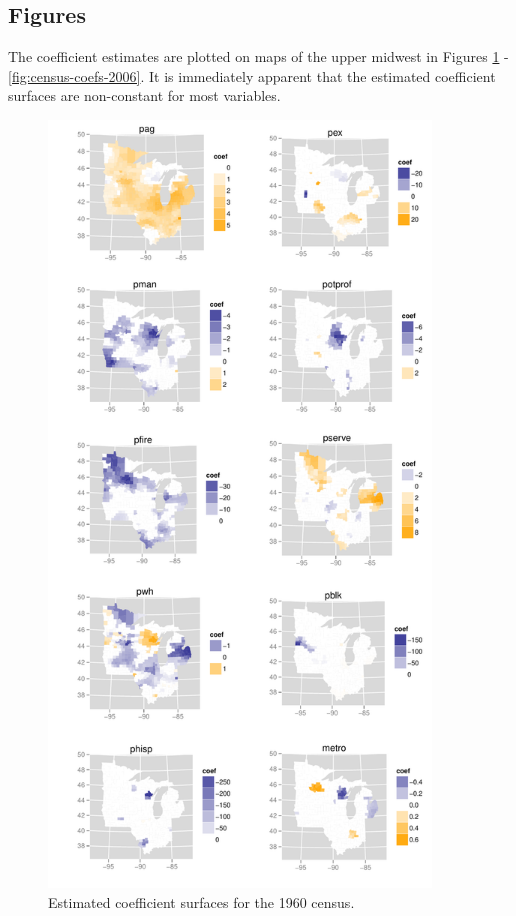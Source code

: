 \documentclass[authoryear, review, 11pt]{elsarticle}
\begin{document}
	\subsection{Figures}
	The coefficient estimates are plotted on maps of the upper midwest in Figures \ref{fig:census-coefs-1960} - \ref{fig:census-coefs-2006}. It is immediately apparent that the estimated coefficient surfaces are non-constant for most variables.\\
		
	\begin{figure}
		\begin{center}
			\includegraphics[height=8in]{../../figures/poverty/1960.linear.coefficients.pdf}
			\caption{Estimated coefficient surfaces for the 1960 census.\label{fig:census-coefs-1960}}
		\end{center}		
	\end{figure}
\end{document}
